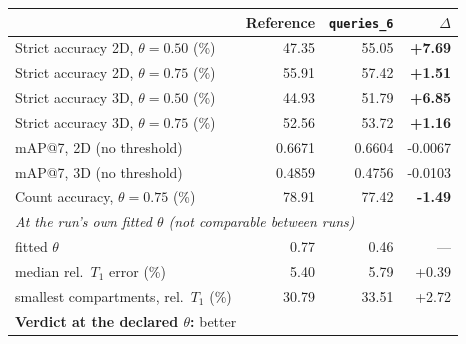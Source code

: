 \renewcommand{\arraystretch}{1.05}
\begin{tabular}{lrrr}
\toprule
 & Reference & \texttt{queries\_6} & $\Delta$ \\
\midrule
Strict accuracy 2D, $\theta = 0.50$ (\%) & 47.35 & 55.05 & \textbf{+7.69} \\
Strict accuracy 2D, $\theta = 0.75$ (\%) & 55.91 & 57.42 & \textbf{+1.51} \\
Strict accuracy 3D, $\theta = 0.50$ (\%) & 44.93 & 51.79 & \textbf{+6.85} \\
Strict accuracy 3D, $\theta = 0.75$ (\%) & 52.56 & 53.72 & \textbf{+1.16} \\
\midrule
mAP@7, 2D (no threshold) & 0.6671 & 0.6604 & -0.0067 \\
mAP@7, 3D (no threshold) & 0.4859 & 0.4756 & -0.0103 \\
\midrule
Count accuracy, $\theta = 0.75$ (\%) & 78.91 & 77.42 & \textbf{-1.49} \\
\midrule
\multicolumn{4}{l}{\emph{At the run's own fitted $\theta$ (not comparable between runs)}} \\
\quad fitted $\theta$ & 0.77 & 0.46 & --- \\
\quad median rel.\ $T_1$ error (\%) & 5.40 & 5.79 & +0.39 \\
\quad smallest compartments, rel.\ $T_1$ (\%) & 30.79 & 33.51 & +2.72 \\
\midrule
\multicolumn{4}{l}{\textbf{Verdict at the declared $\theta$:} better} \\
\bottomrule
\end{tabular}
